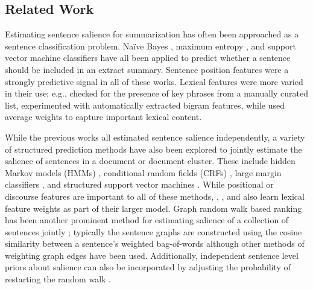 
\subsection{Related Work}

Estimating sentence salience for summarization has often been approached as a 
sentence
classification problem. Na{\"i}ve Bayes 
\cite{kupiec1995trainable,teufel1997sentence,osborne2002using}, 
maximum entropy 
\cite{osborne2002using}, and support vector machine \cite{hirao2002ntt}
classifiers have all been applied to predict whether a sentence should
be included in an extract summary.
Sentence position features were a strongly predictive signal in all of these 
works.
Lexical features were more varied in their use; e.g., 
\cite{kupiec1995trainable} 
checked for the presence of key phrases from a manually curated list,
 \cite{osborne2002using} experimented with automatically extracted
bigram features, 
while \cite{hirao2002ntt} used average \tfidf{} weights to capture
important lexical content.

While the previous works all estimated sentence salience independently,
a variety of structured prediction methods have also been explored
to jointly estimate the salience of sentences in a document or 
document cluster.
These include
hidden Markov models (HMMs) \cite{conroy2001text}, conditional random fields
(CRFs)
\cite{shen2007document}, large margin classifiers \cite{martins2009summarization}, and 
structured support vector
machines 
\cite{berg2011jointly,sipos2012large,durrett2016learning}. 
While positional or discourse features are important to all of these methods, 
\cite{martins2009summarization}, \cite{berg2011jointly}, and \cite{durrett2016learning} 
also learn lexical feature weights as part of their larger model.
Graph random walk based ranking has been another
prominent method for estimating salience of a collection of sentences 
jointly 
\cite{erkan2004lexrank,mihalcea2004textrank};
typically the sentence graphs are constructed using the cosine similarity
between a sentence's \tfidf{} weighted bag-of-words although other methods
of weighting graph edges have been used. Additionally, independent
sentence level priors about salience can also be incorporated by adjusting the 
probability of restarting the random walk \cite{erkan1001using,liu2008personalized}.


